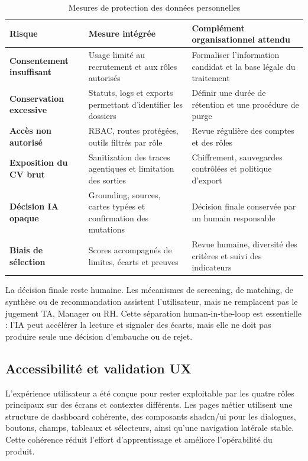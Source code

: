\begin{table}[H]
  \centering
  \caption{Mesures de protection des données personnelles}
  \begin{tabularx}{\textwidth}{>{\bfseries}p{3.3cm}X X}
    \toprule
    Risque & Mesure intégrée & Complément organisationnel attendu \\
    \midrule
    Consentement insuffisant & Usage limité au recrutement et aux rôles autorisés & Formaliser l'information candidat et la base légale du traitement \\
    Conservation excessive & Statuts, logs et exports permettant d'identifier les dossiers & Définir une durée de rétention et une procédure de purge \\
    Accès non autorisé & RBAC, routes protégées, outils filtrés par rôle & Revue régulière des comptes et des rôles \\
    Exposition du CV brut & Sanitization des traces agentiques et limitation des sorties & Chiffrement, sauvegardes contrôlées et politique d'export \\
    Décision IA opaque & Grounding, sources, cartes typées et confirmation des mutations & Décision finale conservée par un humain responsable \\
    Biais de sélection & Scores accompagnés de limites, écarts et preuves & Revue humaine, diversité des critères et suivi des indicateurs \\
    \bottomrule
  \end{tabularx}
\end{table}

La décision finale reste humaine. Les mécanismes de screening, de matching, de synthèse ou de recommandation assistent l'utilisateur, mais ne remplacent pas le jugement TA, Manager ou RH. Cette séparation human-in-the-loop est essentielle : l'IA peut accélérer la lecture et signaler des écarts, mais elle ne doit pas produire seule une décision d'embauche ou de rejet.

\subsection{Accessibilité et validation UX}
L'expérience utilisateur a été conçue pour rester exploitable par les quatre rôles principaux sur des écrans et contextes différents. Les pages métier utilisent une structure de dashboard cohérente, des composants shadcn/ui pour les dialogues, boutons, champs, tableaux et sélecteurs, ainsi qu'une navigation latérale stable. Cette cohérence réduit l'effort d'apprentissage et améliore l'opérabilité du produit.

